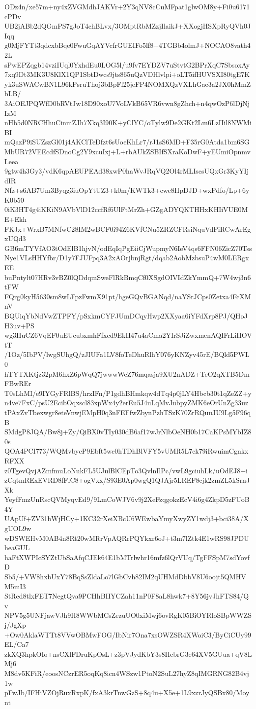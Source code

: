 ODz4n/xe57m+ny4xZVGMdhJAKVr+2Y3qNV8cCuMFpat1glwOM8y+Fi0u6171cPDv
UB2jABb2dQGmPS7gJoT4chBLvx/3OMptRbMZzjIlaikJ+XXogjHSXpRyQVh0JIqq
g0MjFYTt3qdcxbBqe0FwuGqAYVcfrGUEIFo5lf8+4TGBb4olmJ+NOCAO8vath42L
sPwEPZqgb14vziIUql0YxhdEu0LOG5l/u9fv7EYDZV7uStvtG2BPrXqC7SbsoxAy
7xq9Dt3MK3U8KlX1QP1SbtDwcs9jts865uQzVDHlvlpi+oLT5ifHUVSXI80tgE7K
yk3uSWACwBN1L96kPsruThoj3bBpFl25jeFP4NOMXQzVXLhGae3a2JX0hMmZbLB/
3AiOEJPQWfD0bRVtJw18D90xoU7VoLVkB65VR6vwn8gZhch+n4qwOzP6lDjNjIzM
nHb5d0NRCHhuCinmZJh7Xkq3I90K+yClYC/oTylw9De2GKt2Lm6LzIIil8NWMiBI
mQazP9iSUZszGl01j4AKClTeDfzt6sUoeKhLr7/rJ1sS6MD+F35rG0Atda1bm6SG
MbUR72VEEcdfSDnoCg2Y9xcuIxj+L+rbAUkZSBIfSXraKoDwF+yEUmiOpnmvLeea
9gtw4h3Gy3/vdK6qpAEUPEAd38xwP0haWvJRqVQ2Ol4rMLIscsUQxGr3KyYIjdIR
Nfz+s6AB7Um3Byqg3iuOpYtUZ3+k0m/KWTk3+cwe8HpDJD+wxPdfo/Lp+6yK0b50
0iK3HT4g4iKKiN9AVbVlD12ccfRf6UlFtMrZh+GZgADYQKTHHxKHIiVUE0ME+Ekh
FKJx+WrxB7MNfwC28IM2wBCF0i94Z6KVfCNu5ZRZCFRsiNquVdPiRCwArEgxUQd3
GB6mTYVfAO3tOdElB1hjvN/odEqIqPgEiiCjWupmyN6IeV4qs6FFN06ZicZ70Tss
Nye1VLsHHYfbr/D1y7FJUFpq3A2xAOrjbnjRgt/dqab2AobMzbsuP4wM0LERgxEE
buPntylt07HRv3vBZ0lQDdqmSweFlRkBmqCf0XSgdOIVIdZkYmmQ+7W4wj3n6tFW
FQrg0kyH5630sm8wLFpzFwmX91pt/hgeGQvBGANqd/naYSrJCps0Zetxa4FcXMnV
BQUiqYbNdVwZTPFY/pSxkmCYFJUmDCqyHwp2XXyaa6iYFdXrp8PJ/QHoJH3uv+PS
wg3HuCZ6VqEF0uEUcubxmhFfxcd9EkH47u4aCma2YIrSJiZwxmenAQIFrLiHOVtT
/1Oz/5IbPV/lwgSUhgQ/zJIUFa1LV8foTeDhuRlhY076yKNZyv45rE/BQld5PWL0
hTYTXKtjz32pM6hxZ6pWqQ7jwwwWeZ76mqasja9XU2nADZ+TeO2qXTB5DmFBwREr
T0sLhMI/e9IYGyFRlBS/hrzIFn/P1gdhBHmkqw4dTq4p0jLY4Hbcb30t1qZeZZ+y
n4ve7FxC/psU2EcibOqxscl83xpWx4y2erEu5J4uLqMvJubpyZMK6eOrUnZg33uz
tPAxZvTbexwgr8eteVnwjEMpH0q3nFEFfwZbynPzhTSzK70ZrRQuuJU9Lg5F96qB
SMdgP8JQA/Bw8j+Zy/QiBX0vTIy030dB6af17wJrNlbOeNH0b17CaKPsMYbIZ80s
QOA4PCI773/WQMvbycP9Ebft5wc0hTDhBlVFY5vUMR5L7ck79iRwuimCgnkxRFXX
z0TgevQvjAZmfmuLoNukFL5UJulBlCEpTo3QvlnIlPc/vwL9gciuhLk/uOdEJ8+i
zCqtmRExEVRD8fFlC8+ogVxx/S93E0Ap0wgQ1QJAjr5LREF8ejk2zmZL5kSrnJXk
YeyfFmzUnRscQVMyqvEd9/9LmCoWJV6v9j2XeFzqgokzEcV4i6g4ZkpD5zFUoB4Y
UApUf+ZV31bWjHCy+1KC32rXeiXBcU6WEwbaYmyXwyZY1wdj3+bci38A/XgUOL9w
wDSWEHvM0AB4n8Rt20wMRrVpAQRrPQYkxr6oJ+t3m7lZtk4E1wRS98JPDUheaGUL
haFtXWPIcSYZtUbSaAfqCJEk64E1bMTrlwhr16mfz6lQrVUq/TgFFSpM7sdYovfD
Sb5/+VW8hxbUxY78BqSsZldaLo7lGbCvh82IM2qUHMdDbbV8U6oojt5QMHVM5mI3
StRed8tlxFET7NegtQva9PCHhBIIYCZah11nP0F8aL8hwk7+8Y56jvJhFTS84/Qv
NPV5g5UNFjawVJh9H8WWbMCsZezuUO0xiMwj6ovRgK05BiOYRloSBpWWZSj/JgXp
+Ow0AklaWTTt8VVwOBMwFOG/IbNir7Ona7xsOWZSR4XWoiC3/ByCiCUy99EL/Ca7
zkXQ3hpkOIo+nsCXlFDruKpOsL+z3pVJydKbY3s8HcbrG3e64XV5GUua+qV8LMj6
M8dv5KFiR/eoosNCzrER5oqKq8icn4WSzw1PtoN2SuL27hyZ8qIMGRNG82B4vj1w
pFwJb/IFHiVZOjRuxRxpK/fxA3krTnwGzS+8q4u+X5e+1L9xzrJyQSBx80/Moynt
